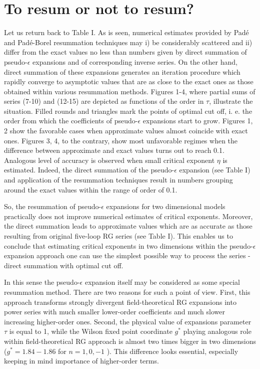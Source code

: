 \documentclass[preprint,preprintnumbers,amsmath,amssymb]{revtex4}
\begin{document}
\section{To resum or not to resum?}

Let us return back to Table I. As is seen, numerical estimates provided by Pad\'e
and Pad\'e-Borel resummation techniques may i) be considerably scattered and
ii) differ from the exact values no less than numbers given by direct summation
of pseudo-$\epsilon$ expansions and of corresponding inverse series. On the other
hand, direct summation of these expansions generates an iteration procedure which
rapidly converge to asymptotic values that are as close to the exact ones as those
obtained within various resummation methods. Figures 1-4, where partial sums of
series (7-10) and (12-15) are depicted as functions of the order in $\tau$,
illustrate the situation. Filled rounds and triangles mark the points of optimal
cut off, i. e. the order from which the coefficients of pseudo-$\epsilon$ expansions
start to grow. Figures 1, 2 show the favorable cases when approximate values almost
coincide with exact ones. Figures 3, 4, to the contrary, show most unfavorable
regimes when the difference between approximate and exact values turns out to reach
0.1. Analogous level of accuracy is observed when small critical exponent $\eta$ is
estimated. Indeed, the direct summation of the pseudo-$\epsilon$ expansion (see
Table I) and application of the resummation techniques result in numbers grouping
around the exact values within the range of order of 0.1.

So, the resummation of pseudo-$\epsilon$ expansions for two dimensional models
practically does not improve numerical estimates of critical exponents. Moreover,
the direct summation leads to approximate values which are as accurate as those
resulting from original five-loop RG series (see Table I). This enables us to
conclude that estimating critical exponents in two dimensions within the
pseudo-$\epsilon$ expansion approach one can use the simplest possible way to
process the series - direct summation with optimal cut off.

In this sense the pseudo-$\epsilon$ expansion itself may be considered as some
special resummation method. There are two reasons for such a point of view. First,
this approach transforms strongly divergent field-theoretical RG expansions into
power series with much smaller lower-order coefficients and much slower increasing
higher-order ones. Second, the physical value of expansions parameter $\tau$ is
equal to 1, while the Wilson fixed point coordinate $g^*$ playing analogous role
within field-theoretical RG approach is almost two times bigger in two dimensions
($g^* = 1.84 - 1.86$ for $n = 1, 0, -1$ \cite{OS2000}). This difference looks
essential, especially keeping in mind importance of higher-order terms.
\end{document}
